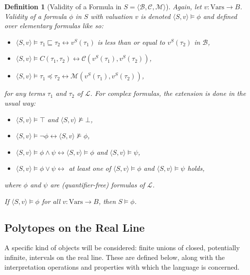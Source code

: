 \documentclass{article}
\newtheorem*{definition}{Definition}
\newcommand{\B}{\mathcal{B}}
\newcommand{\lang}{\mathcal{L}}
\newcommand{\Vars}{\text{Vars}}
\newcommand{\lpart}{\sqsubseteq}
\newcommand{\lcont}{C}
\newcommand{\lmeasure}{\preceq}
\begin{document}
\begin{definition}[Validity of a Formula in $S = \langle \B, \mathcal{C}, \mathcal{M} \rangle$]
  Again, let $v: \Vars \rightarrow B$. Validity of a formula $\phi$ in $S$ with valuation $v$ is denoted $\langle S, v \rangle \models \phi$ and defined over elementary formulas like so:
  \begin{itemize}
  \item $\langle S, v \rangle \models \tau_1 \lpart \tau_2 \leftrightarrow v^S(\tau_1)$ is less than or equal to $v^S(\tau_2)$ in $\B$,
  \item $\langle S, v \rangle \models \lcont(\tau_1, \tau_2) \leftrightarrow \mathcal{C}(v^S(\tau_1), v^S(\tau_2))$,
  \item $\langle S, v \rangle \models \tau_1 \lmeasure \tau_2 \leftrightarrow \mathcal{M}(v^S(\tau_1), v^S(\tau_2))$,
  \end{itemize}
  for any terms $\tau_1$ and $\tau_2$ of $\lang$. For complex formulas, the extension is done in the usual way:
  \begin{itemize}
  \item $\langle S, v \rangle \models \top$ and $\langle S, v \rangle \not \models \bot$,
  \item $\langle S, v \rangle \models \lnot \phi \leftrightarrow \langle S, v \rangle \not\models \phi$,
  \item $\langle S, v \rangle \models \phi \land \psi \leftrightarrow \langle S, v \rangle \models \phi$ and $\langle S, v \rangle \models \psi$,
  \item $\langle S, v \rangle \models \phi \lor \psi \leftrightarrow$ at least one of  $\langle S, v \rangle \models \phi$ and $\langle S, v \rangle \models \psi$ holds,
  \end{itemize}
  where $\phi$ and $\psi$ are (quantifier-free) formulas of $\lang$.

  If $\langle S, v \rangle \models \phi$ for all $v: \Vars \rightarrow B$, then $S \models \phi$.
\end{definition}

\subsection{Polytopes on the Real Line}

A specific kind of objects will be considered: finite unions of closed, potentially infinite, intervals on the real line. These are defined below, along with the interpretation operations and properties with which the language is concerned.
\end{document}
